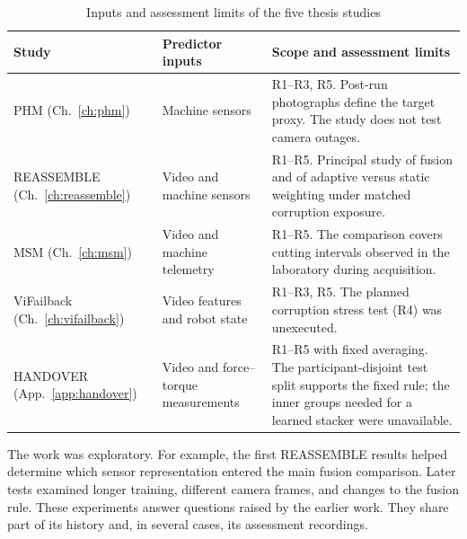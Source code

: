 \begin{table}[H]
  \centering
  \caption{Inputs and assessment limits of the five thesis studies}
  \label{tab:fusion-study-scope}
  \begingroup
  \singlespacing\small
  \setlength{\tabcolsep}{4pt}
  \renewcommand{\arraystretch}{1.28}
  \begin{tabularx}{\linewidth}{@{}P{.22\linewidth} P{.23\linewidth} Y@{}}
    \toprule
    \textbf{Study} & \textbf{Predictor inputs} & \textbf{Scope and assessment limits}\\
    \midrule
    PHM (Ch.~\ref{ch:phm})
      & Machine sensors
      & R1--R3, R5. Post-run photographs define the target proxy.
        The study does not test camera outages.\\
    REASSEMBLE (Ch.~\ref{ch:reassemble})
      & Video and machine sensors
      & R1--R5. Principal study of fusion and of adaptive versus static
        weighting under matched corruption exposure.\\
    MSM (Ch.~\ref{ch:msm})
      & Video and machine telemetry
      & R1--R5. The comparison covers cutting intervals observed in the
        laboratory during acquisition.\\
    ViFailback (Ch.~\ref{ch:vifailback})
      & Video features and robot state
      & R1--R3, R5. The planned corruption stress test (R4) was unexecuted.\\
    HANDOVER (App.~\ref{app:handover})
      & Video and force--torque measurements
      & R1--R5 with fixed averaging. The participant-disjoint test split supports the fixed rule; the inner groups needed for a learned stacker were unavailable.\\
    \bottomrule
  \end{tabularx}
  \endgroup
\end{table}

The work was exploratory. For example, the first REASSEMBLE results helped determine which sensor representation entered the main fusion comparison. Later tests examined longer training, different camera frames, and changes to the fusion rule. These experiments answer questions raised by the earlier work. They share part of its history and, in several cases, its assessment recordings.


